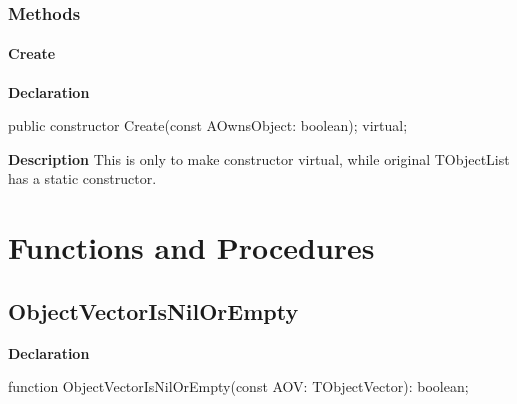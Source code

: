 \documentclass{report}
\newif\ifpdf
\begin{document}
\subsubsection*{\large{\textbf{Methods}}\normalsize\hspace{1ex}\hfill}
\paragraph*{Create}\hspace*{\fill}

\label{PasDoc_ObjectVector.TObjectVector-Create}
\begin{list}{}{
\setlength{\itemindent}{0cm}
\setlength{\listparindent}{0cm}
\setlength{\leftmargin}{\evensidemargin}
\addtolength{\leftmargin}{\tmplength}
\settowidth{\labelsep}{X}
\addtolength{\leftmargin}{\labelsep}
\setlength{\labelwidth}{\tmplength}
}
\item[\textbf{Declaration}\hfill]
\ifpdf
\begin{flushleft}
\fi
\begin{ttfamily}
public constructor Create(const AOwnsObject: boolean); virtual;\end{ttfamily}

\ifpdf
\end{flushleft}
\fi

\par
\item[\textbf{Description}]
This is only to make constructor virtual, while original TObjectList has a static constructor.

\end{list}
\section{Functions and Procedures}
\ifpdf
\subsection*{\large{\textbf{ObjectVectorIsNilOrEmpty}}\normalsize\hspace{1ex}\hrulefill}
\else
\subsection*{ObjectVectorIsNilOrEmpty}
\fi
\label{PasDoc_ObjectVector-ObjectVectorIsNilOrEmpty}
\begin{list}{}{
\setlength{\itemindent}{0cm}
\setlength{\listparindent}{0cm}
\setlength{\leftmargin}{\evensidemargin}
\addtolength{\leftmargin}{\tmplength}
\settowidth{\labelsep}{X}
\addtolength{\leftmargin}{\labelsep}
\setlength{\labelwidth}{\tmplength}
}
\item[\textbf{Declaration}\hfill]
\ifpdf
\begin{flushleft}
\fi
\begin{ttfamily}
function ObjectVectorIsNilOrEmpty(const AOV: TObjectVector): boolean;\end{ttfamily}

\ifpdf
\end{flushleft}
\fi

\end{list}
\end{document}
